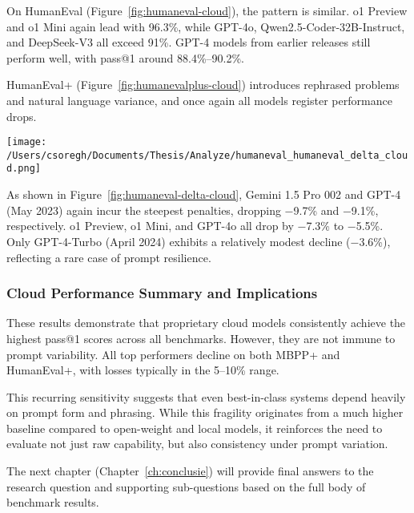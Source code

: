 On HumanEval (Figure~\ref{fig:humaneval-cloud}), the pattern is similar. o1 Preview and o1 Mini again lead with 96.3\%, while GPT-4o, Qwen2.5-Coder-32B-Instruct, and DeepSeek-V3 all exceed 91\%. GPT-4 models from earlier releases still perform well, with pass@1 around 88.4\%--90.2\%.

HumanEval+ (Figure~\ref{fig:humanevalplus-cloud}) introduces rephrased problems and natural language variance, and once again all models register performance drops.

\begin{center}
	\texttt{[image: /Users/csoregh/Documents/Thesis/Analyze/humaneval\_humaneval\_delta\_cloud.png]}
	\label{fig:humaneval-delta-cloud}
\end{center}

As shown in Figure~\ref{fig:humaneval-delta-cloud}, Gemini 1.5 Pro 002 and GPT-4 (May 2023) again incur the steepest penalties, dropping −9.7\% and −9.1\%, respectively. o1 Preview, o1 Mini, and GPT-4o all drop by −7.3\% to −5.5\%. Only GPT-4-Turbo (April 2024) exhibits a relatively modest decline (−3.6\%), reflecting a rare case of prompt resilience.

\subsubsection*{Cloud Performance Summary and Implications}

These results demonstrate that proprietary cloud models consistently achieve the highest pass@1 scores across all benchmarks. However, they are not immune to prompt variability. All top performers decline on both \gls{MBPP}+ and HumanEval+, with losses typically in the 5--10\% range.

This recurring sensitivity suggests that even best-in-class systems depend heavily on prompt form and phrasing. While this fragility originates from a much higher baseline compared to open-weight and local models, it reinforces the need to evaluate not just raw capability, but also consistency under prompt variation.

The next chapter (Chapter~\ref{ch:conclusie}) will provide final answers to the research question and supporting sub-questions based on the full body of benchmark results.
